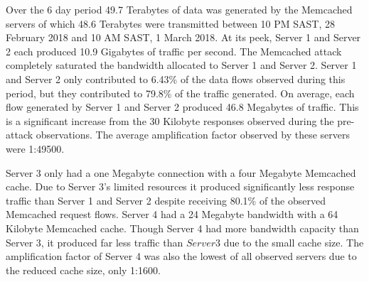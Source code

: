 




Over the 6 day period 49.7 Terabytes of data was generated by the Memcached servers of which 48.6 Terabytes were transmitted between 10 PM SAST, 28 February 2018 and 10 AM SAST, 1 March 2018. At its peek, Server 1 and Server 2 each produced 10.9 Gigabytes of traffic per second. The Memcached attack completely saturated the bandwidth allocated to Server 1 and Server 2. Server 1 and Server 2 only contributed to 6.43\% of the data flows observed during this period, but they contributed to 79.8\% of the traffic generated. On average, each flow generated by Server 1 and Server 2 produced 46.8 Megabytes of traffic. This is a significant increase from the 30 Kilobyte responses observed during the pre-attack observations. The average amplification factor observed by these servers were 1:49500.

Server 3 only had a one Megabyte connection with a four Megabyte Memcached cache. Due to Server 3's limited resources it produced significantly less response traffic than Server 1 and Server 2 despite receiving 80.1\% of the observed Memcached request flows. Server 4 had a 24 Megabyte bandwidth with a 64 Kilobyte Memcached cache. Though Server 4 had more bandwidth capacity than Server 3, it produced far less traffic than $Server 3$ due to the small cache size. The amplification factor of Server 4 was also the lowest of all observed servers due to the reduced cache size, only 1:1600. 

